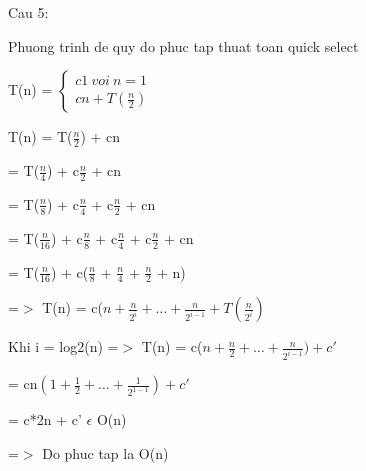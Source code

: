\documentclass{article}
\begin{document}
\noindent Cau 5:

\noindent Phuong trinh de quy do phuc tap thuat toan quick select

\noindent T(n) = $\left\{ \begin{array}{c}
c1\ voi\ n=1 \\ 
cn+T(\frac{n}{2}) \end{array}
\right.$

\noindent T(n) = T($\frac{n}{2}$) + cn

  = T($\frac{n}{4}$) + c$\frac{n}{2}$ + cn

  = T($\frac{n}{8}$) + c$\frac{n}{4}$ + c$\frac{n}{2}$ + cn

  = T($\frac{n}{16}$) + c$\frac{n}{8}$ + c$\frac{n}{4}$ + c$\frac{n}{2}$  + cn

  = T($\frac{n}{16}$) + c($\frac{n}{8}$ + $\frac{n}{4}$ + $\frac{n}{2}$ + n) 

\noindent =$\mathrm{>}$ T(n) = c($n+\frac{n}{2^i}+\dots +\frac{n}{2^{i-1}}+T(\frac{n}{2^i})$

\noindent Khi i = log2(n) =$\mathrm{>}$ T(n) = c($n+\frac{n}{2}+\dots +\frac{n}{2^{i-1}})+c'$

     = cn$\left(1+\frac{1}{2}+\dots +\frac{1}{2^{1-1}}\right)+c'$

     = c*2n + c' $\epsilon $ O(n)

\noindent =$\mathrm{>}$ Do phuc tap la O(n)

\noindent 

\noindent 

\noindent 

\noindent 

\noindent 
\end{document}
